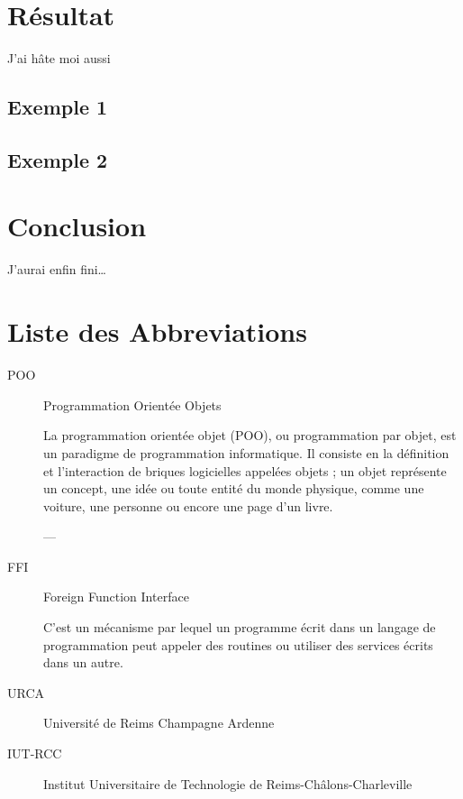 \documentclass[11pt,a4paper,krantz2,11pt,oneside]{krantz}
\begin{document}
\hypertarget{res}{%
\chapter{Résultat}\label{res}}

J'ai hâte moi aussi

\hypertarget{exemple-1}{%
\section{Exemple 1}\label{exemple-1}}

\hypertarget{exemple-2}{%
\section{Exemple 2}\label{exemple-2}}

\hypertarget{conclusion}{%
\chapter*{Conclusion}\label{conclusion}}


J'aurai enfin fini\ldots{}

\hypertarget{liste-des-abbreviations}{%
\chapter*{Liste des Abbreviations}\label{liste-des-abbreviations}}


\begin{description}
\item[POO]
Programmation Orientée Objets

La programmation orientée objet (POO), ou programmation par objet, est un paradigme de programmation informatique. Il consiste en la définition et l'interaction de briques logicielles appelées objets ; un objet représente un concept, une idée ou toute entité du monde physique, comme une voiture, une personne ou encore une page d'un livre.

--- \citep{wikipedia_programmation_2020}
\item[FFI]
Foreign Function Interface

C'est un mécanisme par lequel un programme écrit dans un langage de programmation peut appeler des routines ou utiliser des services écrits dans un autre.
\item[URCA]
Université de Reims Champagne Ardenne
\item[IUT-RCC]
Institut Universitaire de Technologie de Reims-Châlons-Charleville
\end{description}

\backmatter



\printindex
\end{document}
